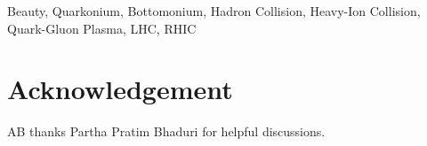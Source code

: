 \documentclass[review]{elsarticle}
\begin{document}
  
\begin{keyword}
   Beauty, Quarkonium, Bottomonium, Hadron Collision, Heavy-Ion Collision, Quark-Gluon Plasma, LHC, RHIC
\end{keyword}
  
 
\maketitle
\newpage
\tableofcontents






\section*{Acknowledgement}
AB thanks Partha Pratim Bhaduri for helpful discussions. 


\end{document}
